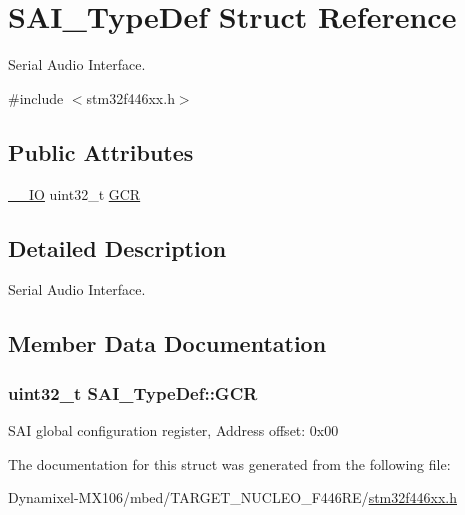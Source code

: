 \hypertarget{struct_s_a_i___type_def}{}\section{S\+A\+I\+\_\+\+Type\+Def Struct Reference}
\label{struct_s_a_i___type_def}


Serial Audio Interface.  




{\ttfamily \#include $<$stm32f446xx.\+h$>$}

\subsection*{Public Attributes}
\begin{DoxyCompactItemize}
\item 
\hyperlink{core__sc300_8h_aec43007d9998a0a0e01faede4133d6be}{\+\_\+\+\_\+\+IO} uint32\+\_\+t \hyperlink{struct_s_a_i___type_def_ada6999b49bbe697c1dd5fdabc9bad7f4}{G\+CR}
\end{DoxyCompactItemize}


\subsection{Detailed Description}
Serial Audio Interface. 

\subsection{Member Data Documentation}
\subsubsection[{\texorpdfstring{G\+CR}{GCR}}]{ uint32\+\_\+t S\+A\+I\+\_\+\+Type\+Def\+::\+G\+CR}\hypertarget{struct_s_a_i___type_def_ada6999b49bbe697c1dd5fdabc9bad7f4}{}\label{struct_s_a_i___type_def_ada6999b49bbe697c1dd5fdabc9bad7f4}
S\+AI global configuration register, Address offset\+: 0x00 

The documentation for this struct was generated from the following file\+:\begin{DoxyCompactItemize}
\item 
Dynamixel-\/\+M\+X106/mbed/\+T\+A\+R\+G\+E\+T\+\_\+\+N\+U\+C\+L\+E\+O\+\_\+\+F446\+R\+E/\hyperlink{stm32f446xx_8h}{stm32f446xx.\+h}\end{DoxyCompactItemize}
